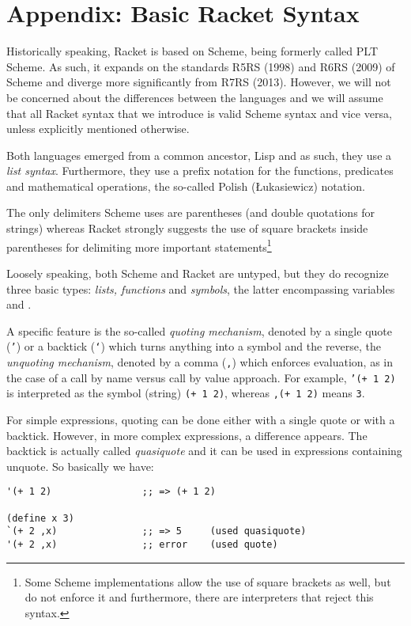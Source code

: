 
\chapter*{Appendix: Basic Racket Syntax}
\label{ch:a-racket}

\indent\indent Historically speaking, Racket is based on Scheme, being formerly called
PLT Scheme. As such, it expands on the standards R5RS (1998) and R6RS (2009)
of Scheme and diverge more significantly from R7RS (2013). However, we will
not be concerned about the differences between the languages and we will
assume that all Racket syntax that we introduce is valid Scheme syntax and
vice versa, unless explicitly mentioned otherwise.

Both languages emerged from a common ancestor, Lisp and as such, they
use a \emph{list syntax}. Furthermore, they use a prefix notation
for the functions, predicates and mathematical operations, the so-called
Polish ({\L}ukasiewicz) notation.

The only delimiters Scheme uses are parentheses (and double quotations
for strings) whereas Racket strongly suggests the use of square brackets
inside parentheses for delimiting more important statements\footnote{Some %
  Scheme implementations allow the use of square brackets as well, but
  do not enforce it and furthermore, there are interpreters that reject
  this syntax.}

Loosely speaking, both Scheme and Racket are untyped, but they do recognize
three basic types: \emph{lists, functions} and \emph{symbols}, the
latter encompassing variables and .

A specific feature is the so-called \emph{quoting mechanism}, denoted
by a single quote (\texttt{'}) or a backtick (\texttt{`}) which
turns anything into a symbol and the reverse, the \emph{unquoting mechanism},
denoted by a comma (\texttt{,}) which enforces evaluation, as in the
case of a call by name versus call by value approach. For example,
\texttt{'(+ 1 2)} is interpreted as the symbol (string) \texttt{(+ 1 2)},
whereas \texttt{,(+ 1 2)} means \texttt{3}.

For simple expressions, quoting can be done either with a single
quote or with a backtick. However, in more complex expressions,
a difference appears. The backtick is actually called
\emph{quasiquote} and it can be used in expressions containing
unquote. So basically we have:
{
  \small
\begin{verbatim}
'(+ 1 2)                ;; => (+ 1 2)

(define x 3)
`(+ 2 ,x)               ;; => 5     (used quasiquote)
'(+ 2 ,x)               ;; error    (used quote)
\end{verbatim}
}

